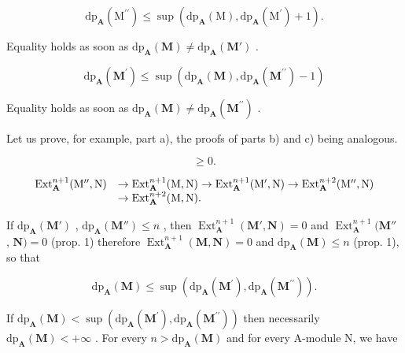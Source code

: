 \[
\mathrm{dp} _ {\mathbf {A}} \left(\mathrm{M} ^ {\prime \prime}\right) \leqslant \sup \left(\mathrm{dp} _ {\mathbf {A}} (\mathrm{M}), \mathrm{dp} _ {\mathbf {A}} \left(\mathrm{M} ^ {\prime}\right) + 1\right).
\]

Equality holds as soon as \(\mathrm{dp}_{\mathbf{A}}(\mathbf{M}) \neq \mathrm{dp}_{\mathbf{A}}(\mathbf{M}')\) .

\[
\mathrm{dp} _ {\mathbf {A}} \left(\mathbf {M} ^ {\prime}\right) \leqslant \sup \left(\mathrm{dp} _ {\mathbf {A}} (\mathbf {M}), \mathrm{dp} _ {\mathbf {A}} \left(\mathbf {M} ^ {\prime \prime}\right) - 1\right)
\]

Equality holds as soon as \(\mathrm{dp}_{\mathbf{A}}(\mathbf{M}) \neq \mathrm{dp}_{\mathbf{A}}(\mathbf{M}^{\prime \prime})\) .

Let us prove, for example, part a), the proofs of parts b) and c) being analogous.

\[
\geqslant 0.
\]

\[
\begin{array}{r l}\operatorname{Ext} _ {\mathbf {A}} ^ {n + 1} (\mathrm{M} ^ {\prime \prime}, \mathrm{N})&\rightarrow \operatorname{Ext} _ {\mathbf {A}} ^ {n + 1} (\mathrm{M}, \mathrm{N}) \rightarrow \operatorname{Ext} _ {\mathbf {A}} ^ {n + 1} (\mathrm{M} ^ {\prime}, \mathrm{N}) \rightarrow \operatorname{Ext} _ {\mathbf {A}} ^ {n + 2} (\mathrm{M} ^ {\prime \prime}, \mathrm{N})\\&\rightarrow \operatorname{Ext} _ {\mathbf {A}} ^ {n + 2} (\mathrm{M}, \mathrm{N}).\end{array}
\]

If \(\mathrm{dp}_{\mathbf{A}}(\mathbf{M}')\) , \(\mathrm{dp}_{\mathbf{A}}(\mathbf{M}'')\leqslant n\) , then \(\operatorname{Ext}_{\mathbf{A}}^{n+1}(\mathbf{M}',\mathbf{N})=0\) and \(\operatorname{Ext}_{\mathbf{A}}^{n+1}(\mathbf{M}''\) , \(\mathbf{N})=0\) (prop. 1) therefore \(\operatorname{Ext}_{\mathbf{A}}^{n+1}(\mathbf{M},\mathbf{N})=0\) and \(\mathrm{dp}_{\mathbf{A}}(\mathbf{M})\leqslant n\) (prop. 1), so that

\[
\mathrm{dp} _ {\mathbf {A}} (\mathbf {M}) \leqslant \sup \left(\mathrm{dp} _ {\mathbf {A}} (\mathbf {M} ^ {\prime}), \mathrm{dp} _ {\mathbf {A}} (\mathbf {M} ^ {\prime \prime})\right).
\]

If \(\mathrm{dp}_{\mathbf{A}}(\mathbf{M}) < \sup (\mathrm{dp}_{\mathbf{A}}(\mathbf{M}^{\prime}),\mathrm{dp}_{\mathbf{A}}(\mathbf{M}^{\prime \prime}))\) then necessarily \(\mathrm{dp}_{\mathbf{A}}(\mathbf{M}) < + \infty\) . For every \(n > \mathrm{dp}_{\mathbf{A}}(\mathbf{M})\) and for every A-module N, we have

